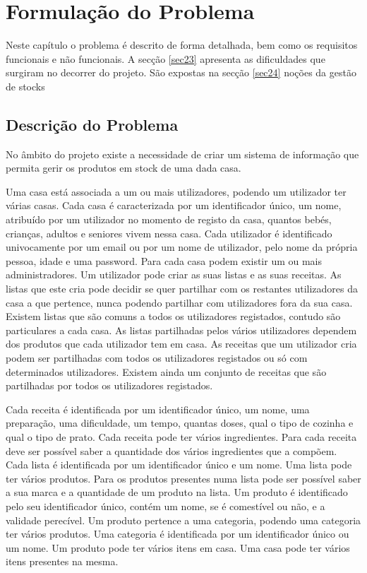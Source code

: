 %
%
\chapter{Formulação do Problema } \label{cap2}

Neste capítulo o problema é descrito de forma detalhada, bem como os requisitos funcionais e não funcionais. A secção \ref{sec23} apresenta as dificuldades que surgiram no decorrer do projeto. São expostas na secção \ref{sec24} noções da gestão de stocks 


%
%
\section{Descrição do Problema} \label{sec21}
No âmbito do projeto existe a necessidade de criar um sistema de informação que permita gerir os produtos em stock de uma dada casa.

Uma casa está associada a um ou mais utilizadores, podendo um utilizador ter várias casas. Cada casa é caracterizada por um identificador único, um nome, atribuído por um utilizador no momento de registo da casa, quantos bebés, crianças, adultos e seniores vivem nessa casa. Cada utilizador é identificado univocamente por um email ou por um nome de utilizador, pelo nome da própria pessoa, idade e uma password. Para cada casa podem existir um ou mais administradores. Um utilizador pode criar as suas listas e as suas receitas. As listas que este cria pode decidir se quer partilhar com os restantes utilizadores da casa a que pertence, nunca podendo partilhar com utilizadores fora da sua casa. Existem listas que são comuns a todos os utilizadores registados, contudo são particulares a cada casa. As listas partilhadas pelos vários utilizadores dependem dos produtos que cada utilizador tem em casa. As receitas que um utilizador cria podem ser partilhadas com todos os utilizadores registados ou só com determinados utilizadores. Existem ainda um conjunto de receitas que são partilhadas por todos os utilizadores registados.

Cada receita é identificada por um identificador único, um nome, uma preparação, uma dificuldade, um tempo, quantas doses, qual o tipo de cozinha e qual o tipo de prato. Cada receita pode ter vários ingredientes. Para cada receita deve ser possível saber a quantidade dos vários ingredientes que a compõem.
Cada lista é identificada por um identificador único e um nome. Uma lista pode ter vários produtos. Para os produtos presentes numa lista pode ser possível saber a sua marca e a quantidade de um produto na lista. Um produto é identificado pelo seu identificador único, contém um nome, se é comestível ou não, e a validade perecível. Um produto pertence a uma categoria, podendo uma categoria ter vários produtos. Uma categoria é identificada por um identificador único ou um nome. Um produto pode ter vários itens em casa. Uma casa pode ter vários itens presentes na mesma. 

